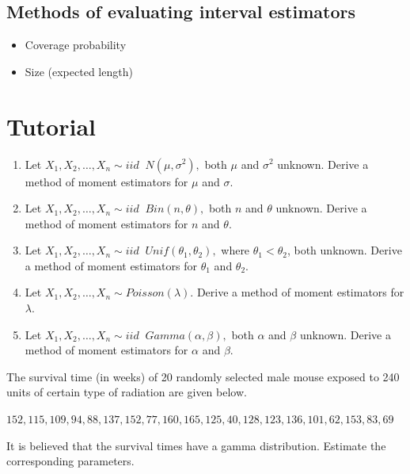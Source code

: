 \documentclass[]{book}
\providecommand{\tightlist}{%
  \setlength{\itemsep}{0pt}\setlength{\parskip}{0pt}}
\begin{document}
\hypertarget{methods-of-evaluating-interval-estimators}{%
\subsection{Methods of evaluating interval estimators}\label{methods-of-evaluating-interval-estimators}}

\begin{itemize}
\tightlist
\item
  Coverage probability
\item
  Size (expected length)
\end{itemize}

\newpage
{}

\hypertarget{tutorial-1}{%
\section*{Tutorial}\label{tutorial-1}}

\begin{enumerate}
\def\labelenumi{\arabic{enumi}.}
\item
  Let \(X_1, X_2, \dots, X_n \sim iid\;\; N(\mu, \sigma^2),\) both \(\mu\) and \(\sigma^2\) unknown. Derive a method of moment estimators for \(\mu\) and \(\sigma\).
\item
  Let \(X_1, X_2, \dots, X_n \sim iid\;\; Bin(n,\theta),\) both \(n\) and \(\theta\) unknown. Derive a method of moment estimators for \(n\) and \(\theta\).
\item
  Let \(X_1, X_2, \dots, X_n \sim iid\;\; Unif(\theta_1,\theta_2),\) where \(\theta_1<\theta_2\), both unknown. Derive a method of moment estimators for \(\theta_1\) and \(\theta_2\).
\item
  Let \(X_1, X_2, \dots, X_n \sim Poisson(\lambda).\) Derive a method of moment estimators for \(\lambda\).
\item
  Let \(X_1, X_2, \dots, X_n \sim iid\;\; Gamma(\alpha,\beta),\) both \(\alpha\) and \(\beta\) unknown. Derive a method of moment estimators for \(\alpha\) and \(\beta\).
\end{enumerate}

The survival time (in weeks) of 20 randomly selected male mouse exposed to 240 units of certain type of radiation are given below.

\(152, 115, 109, 94, 88, 137, 152, 77, 160, 165, 125, 40, 128, 123, 136, 101, 62, 153, 83, 69\)

It is believed that the survival times have a gamma distribution. Estimate the corresponding parameters.
\end{document}
